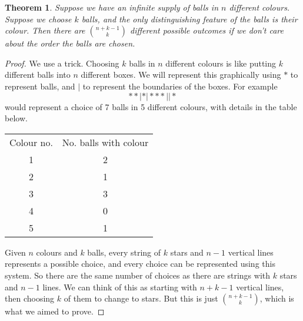 \documentclass{article}
\theoremstyle{plain}
\newtheorem{theorem}{Theorem}[section]{\bfseries}{\itshape}
\begin{document}
\begin{theorem}\label{T:balls}
Suppose we have an infinite supply of balls in $n$ different colours. Suppose we choose $k$ balls, and the only distinguishing feature of the balls is their colour. Then there are ${n+k-1 \choose k}$ different possible outcomes if we don't care about the order the balls are chosen.
\end{theorem}
\begin{proof}
We use a trick. Choosing $k$ balls in $n$ different colours is like putting $k$ different balls into $n$ different boxes. We will represent this graphically using $*$ to represent balls, and $|$ to represent the boundaries of the boxes. For example 
\[**|*|***||*\]
would represent a choice of 7 balls in 5 different colours, with details in the table below. 

\begin{center}
\begin{tabular}{ c | c  }
  Colour no. & No. balls with colour  \\
  1 & 2  \\
  2 & 1 \\
	3 & 3\\
	4 & 0\\
	5 & 1
\end{tabular}
\end{center}

Given $n$ colours and $k$ balls, every string of $k$ stars and $n-1$ vertical lines represents a possible choice, and every choice can be represented using this system. So there are the same number of choices as there are strings with $k$ stars and $n-1$ lines. We can think of this as starting with $n+k-1$ vertical lines, then choosing $k$ of them to change to stars. But this is just ${n+k -1 \choose k}$, which is what we aimed to prove.
\end{proof}
\end{document}
